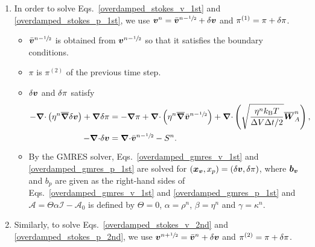 \documentclass[
10pt
showpacs, showkeys,
amsmath,amssymb,
aps,
pre,
floatfix,
]{revtex4-1}
\newcommand{\divg}{{\V\nabla\cdot}}                       %
\newcommand{\paren}[1]{{(#1)}}                            %
\begin{document}
\begin{enumerate}

\item In order to solve Eqs.~\eqref{overdamped_stokes_v_1st} and \eqref{overdamped_stokes_p_1st}, we use $\boldsymbol{v}^n=\bar{\boldsymbol{v}}^{n-\sfrac{1}{2}}+\delta\boldsymbol{v}$ and $\pi^\paren{1}=\pi+\d{\pi}$.

\begin{itemize}
\item $\bar{\boldsymbol{v}}^{n-\sfrac{1}{2}}$ is obtained from $\boldsymbol{v}^{n-\sfrac{1}{2}}$ so that it satisfies the boundary conditions.
\item $\pi$ is $\pi^\paren{2}$ of the previous time step.
\item $\delta\boldsymbol{v}$ and $\delta\pi$ satisfy
\begin{align}
\label{overdamped_gmres_v_1st}
-\divg\left(\eta^n\overline{\grad}\d{\V{v}}\right) + \grad\d{\pi}
& = -\grad\pi 
 + \divg\left( \eta^n \overline{\grad}\bar{\V{v}}^{n-\myhalf} \right)
+ \divg\left( \sqrt{\frac{\eta^n k_\mathrm{B}T}{\D{V}\D{t}/2} } \overline{\V{W}}^n_A \right),\\
\label{overdamped_gmres_p_1st}
-\divg\d{\V{v}} & = \divg\bar{\V{v}}^{n-\myhalf}-S^n.
\end{align}
\item By the GMRES solver, Eqs.~\eqref{overdamped_gmres_v_1st} and \eqref{overdamped_gmres_p_1st} are solved for $(\boldsymbol{x}_{\boldsymbol{v}},x_p)=(\delta\boldsymbol{v},\delta\pi)$, where $\boldsymbol{b}_{\boldsymbol{v}}$ and $b_p$ are given as the right-hand sides of Eqs.~\eqref{overdamped_gmres_v_1st} and \eqref{overdamped_gmres_p_1st} and $\mathcal{A}=\Theta\alpha\mathcal{I}-\mathcal{A}_0$ is defined by $\Theta=0$, $\alpha=\rho^n$, $\beta=\eta^n$ and $\gamma=\kappa^n$.
\end{itemize}

\item Similarly, to solve Eqs.~\eqref{overdamped_stokes_v_2nd} and \eqref{overdamped_stokes_p_2nd}, we use $\boldsymbol{v}^{n+\sfrac{1}{2}}=\bar{\boldsymbol{v}}^n+\delta\boldsymbol{v}$ and $\pi^\paren{2}=\pi+\d{\pi}$.


\end{enumerate}
\end{document}
